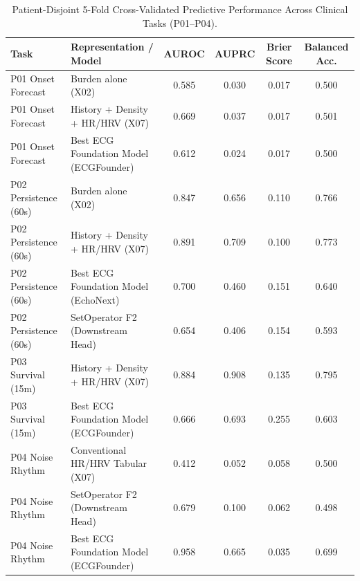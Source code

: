 \begin{table}[t]
\centering
\caption{Patient-Disjoint 5-Fold Cross-Validated Predictive Performance Across Clinical Tasks (P01--P04).}
\label{tab:v7p_benchmarks}
\small
\begin{tabular}{llcccc}
\toprule
Task & Representation / Model & AUROC & AUPRC & Brier Score & Balanced Acc. \\
\midrule
P01 Onset Forecast & Burden alone (X02) & 0.585 & 0.030 & 0.017 & 0.500 \\
P01 Onset Forecast & History + Density + HR/HRV (X07) & 0.669 & 0.037 & 0.017 & 0.501 \\
P01 Onset Forecast & Best ECG Foundation Model (ECGFounder) & 0.612 & 0.024 & 0.017 & 0.500 \\
\midrule
P02 Persistence (60s) & Burden alone (X02) & 0.847 & 0.656 & 0.110 & 0.766 \\
P02 Persistence (60s) & History + Density + HR/HRV (X07) & 0.891 & 0.709 & 0.100 & 0.773 \\
P02 Persistence (60s) & Best ECG Foundation Model (EchoNext) & 0.700 & 0.460 & 0.151 & 0.640 \\
P02 Persistence (60s) & SetOperator F2 (Downstream Head) & 0.654 & 0.406 & 0.154 & 0.593 \\
\midrule
P03 Survival (15m) & History + Density + HR/HRV (X07) & 0.884 & 0.908 & 0.135 & 0.795 \\
P03 Survival (15m) & Best ECG Foundation Model (ECGFounder) & 0.666 & 0.693 & 0.255 & 0.603 \\
\midrule
P04 Noise Rhythm & Conventional HR/HRV Tabular (X07) & 0.412 & 0.052 & 0.058 & 0.500 \\
P04 Noise Rhythm & SetOperator F2 (Downstream Head) & 0.679 & 0.100 & 0.062 & 0.498 \\
P04 Noise Rhythm & Best ECG Foundation Model (ECGFounder) & 0.958 & 0.665 & 0.035 & 0.699 \\
\bottomrule
\end{tabular}
\end{table}
